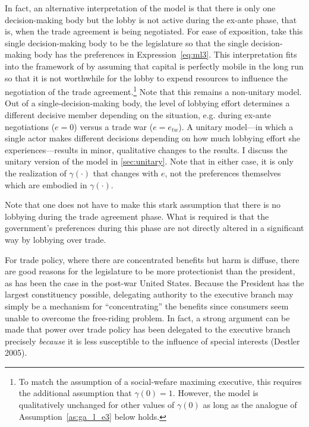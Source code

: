 \documentclass[authoryear, review]{elsarticle}
\newcommand{\ga}{\gamma}
\begin{document}
In fact, an alternative interpretation of the model is that there is only one decision-making body but the lobby is not active during the ex-ante phase, that is, when the trade agreement is being negotiated. For ease of exposition, take this single decision-making body to be the legislature so that the single decision-making body has the preferences in Expression~\ref{eq:ml3}. This interpretation fits into the framework of \citet{mrc2007} by assuming that capital is perfectly mobile in the long run so that it is not worthwhile for the lobby to expend resources to influence the negotiation of the trade agreement.\footnote{To match the assumption of a social-wefare maximing executive, this requires the additional assumption that $\ga(0)=1.$ However, the model is qualitatively unchanged for other values of $\ga(0)$ as long as the analogue of Assumption~\ref{as:ga_l_e3} below holds.} Note that this remains a non-unitary model. Out of a single-decision-making body, the level of lobbying effort determines a different decisive member depending on the situation, e.g. during ex-ante negotiations ($e=0$) versus a trade war ($e=e_{tw}$). A unitary model---in which a single actor makes different decisions depending on how much lobbying effort she experiences---results in minor, qualitative changes to the results. I discuss the unitary version of the model in \ref{sec:unitary}. Note that in either case, it is only the realization of $\ga(\cdot)$ that changes with $e$, not the preferences themselves which are embodied in $\ga(\cdot)$.

Note that one does not have to make this stark assumption that there is no lobbying during the trade agreement phase. What is required is that the government's preferences during this phase are not directly altered in a significant way by lobbying over trade.

For trade policy, where there are concentrated benefits but harm is diffuse, there are good reasons for the legislature to be more protectionist than the president, as has been the case in the post-war United States. Because the President has the largest constituency possible, delegating authority to the executive branch may simply be a mechanism for ``concentrating'' the benefits since consumers seem unable to overcome the free-riding problem. In fact, a strong argument can be made that power over trade policy has been delegated to the executive branch precisely \textit{because} it is less susceptible to the influence of special interests (Destler 2005). %
\end{document}
